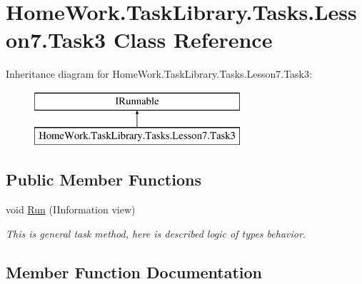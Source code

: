 \hypertarget{class_home_work_1_1_task_library_1_1_tasks_1_1_lesson7_1_1_task3}{}\section{Home\+Work.\+Task\+Library.\+Tasks.\+Lesson7.\+Task3 Class Reference}
\label{class_home_work_1_1_task_library_1_1_tasks_1_1_lesson7_1_1_task3}
Inheritance diagram for Home\+Work.\+Task\+Library.\+Tasks.\+Lesson7.\+Task3\+:\begin{figure}[H]
\begin{center}
\leavevmode
\includegraphics[height=2.000000cm]{class_home_work_1_1_task_library_1_1_tasks_1_1_lesson7_1_1_task3}
\end{center}
\end{figure}
\subsection*{Public Member Functions}
\begin{DoxyCompactItemize}
\item 
void \mbox{\hyperlink{class_home_work_1_1_task_library_1_1_tasks_1_1_lesson7_1_1_task3_aa8baca2e5beaa27bcc67a74d7f2d4d32}{Run}} (I\+Information view)
\begin{DoxyCompactList}\small\item\em This is general task method, here is described logic of types behavior. \end{DoxyCompactList}\end{DoxyCompactItemize}


\subsection{Member Function Documentation}
\mbox{\label{class_home_work_1_1_task_library_1_1_tasks_1_1_lesson7_1_1_task3_aa8baca2e5beaa27bcc67a74d7f2d4d32}} 
